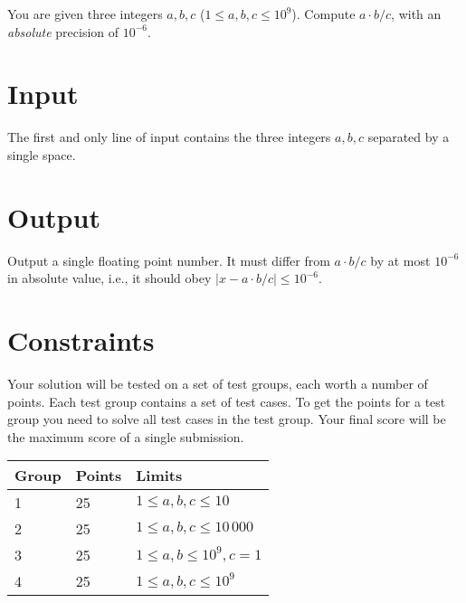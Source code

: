 
You are given three integers $a, b, c$ ($1 \le a, b, c \le 10^9$). Compute $a \cdot b / c$, with an \emph{absolute} precision of $10^{-6}$.

\section*{Input}
The first and only line of input contains the three integers $a, b, c$ separated by a single space.

\section*{Output}
Output a single floating point number. It must differ from $a \cdot b / c$ by at most $10^{-6}$ in absolute value, i.e., it should obey $|x - a \cdot b / c| \le 10^{-6}$.

\section*{Constraints}
Your solution will be tested on a set of test groups, each worth a number of points.
Each test group contains a set of test cases.
To get the points for a test group you need to solve all test cases in the test group.
Your final score will be the maximum score of a single submission.

\noindent
\begin{tabular}{| l | l | l |}
\hline
Group & Points & Limits \\ \hline
1     & 25     & $1 \le a, b, c \le 10$ \\ \hline
2     & 25     & $1 \le a, b, c \le 10\,000$ \\ \hline
3     & 25     & $1 \le a, b \le 10^9, c = 1$ \\ \hline
4     & 25     & $1 \le a, b, c \le 10^9$ \\ \hline
\end{tabular}
